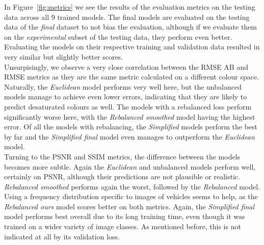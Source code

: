 \documentclass{article}
\begin{document}
In Figure~\ref{fig:metrics} we see the results of the evaluation metrics on the testing data across all 9 trained models.
The final models are evaluated on the testing data of the \textit{final} dataset to not bias the evaluation, although if
we evaluate them on the \textit{experimental} subset of the testing data, they perform even better.
Evaluating the models on their respective training and validation data resulted in very similar but slightly better scores.\\
Unsurpisingly, we observe a very close correlation between the RMSE AB and RMSE metrics as they are the same metric calculated
on a different colour space.
Naturally, the \textit{Euclidean} model performs very well here, but the unbalanced models manage to achieve even
lower errors, indicating that they are likely to predict desaturated colours as well.
The models with a rebalanced loss perform significantly worse here, with the \textit{Rebalanced smoothed} model having the highest error.
Of all the models with rebalancing, the \textit{Simplified} models perform the best by far and the
\textit{Simplified final} model even manages to outperform the \textit{Euclidean} model.\\
Turning to the PSNR and SSIM metrics, the difference between the models becomes more subtle.
Again the \textit{Euclidean} and unbalanced models perform well, certainly on PSNR, although
their predictions are not plausible or realistic.
\textit{Rebalanced smoothed} performs again the worst, followed by the \textit{Rebalanced} model.
Using a frequency distribution specific to images of vehicles seems to help, as the
\textit{Rebalanced ours} model scores better on both metrics.
Again, the \textit{Simplified final} model performs best overall due to its long training time, even though it was trained on a wider variety of image classes.
As mentioned before, this is not indicated at all by its validation loss.
\end{document}
